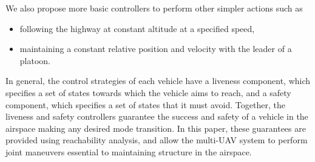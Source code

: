 We also propose more basic controllers to perform other simpler actions such as
\begin{itemize}
\item following the highway at constant altitude at a specified speed,
\item maintaining a constant relative position and velocity with the leader of a platoon.
\end{itemize}

In general, the control strategies of each vehicle have a liveness component, which specifies a set of states towards which the vehicle aims to reach, and a safety component, which specifies a set of states that it must avoid. Together, the liveness and safety controllers guarantee the success and safety of a vehicle in the airspace making any desired mode transition. In this paper, these guarantees are provided using reachability analysis, and allow the multi-UAV system to perform joint maneuvers essential to maintaining structure in the airspace.
